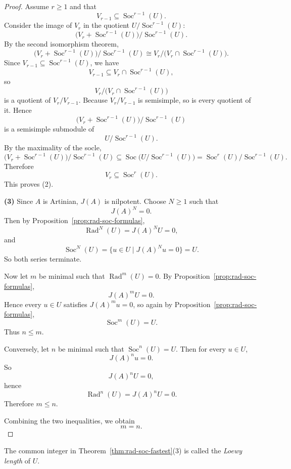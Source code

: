 \begin{proof}
    Assume $r\ge 1$ and that
    \[
        V_{r-1}\subseteq \operatorname{Soc}^{r-1}(U).
    \]
    Consider the image of $V_r$ in the quotient $U/\operatorname{Soc}^{r-1}(U)$:
    \[
        \bigl(V_r+\operatorname{Soc}^{r-1}(U)\bigr)\big/\operatorname{Soc}^{r-1}(U).
    \]
    By the second isomorphism theorem,
    \[
        \bigl(V_r+\operatorname{Soc}^{r-1}(U)\bigr)\big/\operatorname{Soc}^{r-1}(U)
        \cong
        V_r/\bigl(V_r\cap \operatorname{Soc}^{r-1}(U)\bigr).
    \]
    Since $V_{r-1}\subseteq \operatorname{Soc}^{r-1}(U)$, we have
    \[
        V_{r-1}\subseteq V_r\cap \operatorname{Soc}^{r-1}(U),
    \]
    so
    \[
        V_r/\bigl(V_r\cap \operatorname{Soc}^{r-1}(U)\bigr)
    \]
    is a quotient of $V_r/V_{r-1}$. Because $V_r/V_{r-1}$ is semisimple, so is every quotient of it.
    Hence
    \[
        \bigl(V_r+\operatorname{Soc}^{r-1}(U)\bigr)\big/\operatorname{Soc}^{r-1}(U)
    \]
    is a semisimple submodule of
    \[
        U/\operatorname{Soc}^{r-1}(U).
    \]
    By the maximality of the socle,
    \[
        \bigl(V_r+\operatorname{Soc}^{r-1}(U)\bigr)\big/\operatorname{Soc}^{r-1}(U)
        \subseteq
        \operatorname{Soc}\bigl(U/\operatorname{Soc}^{r-1}(U)\bigr)
        =
        \operatorname{Soc}^r(U)/\operatorname{Soc}^{r-1}(U).
    \]
    Therefore
    \[
        V_r\subseteq \operatorname{Soc}^r(U).
    \]
    This proves \textup{(2)}.

    \bigskip

    \textbf{(3)} Since $A$ is Artinian, $J(A)$ is nilpotent. Choose $N\ge 1$ such that
    \[
        J(A)^N=0.
    \]
    Then by Proposition~\ref{prop:rad-soc-formulas},
    \[
        \operatorname{Rad}^N(U)=J(A)^N U=0,
    \]
    and
    \[
        \operatorname{Soc}^N(U)=\{u\in U\mid J(A)^N u=0\}=U.
    \]
    So both series terminate.

    Now let $m$ be minimal such that $\operatorname{Rad}^m(U)=0$. By Proposition~\ref{prop:rad-soc-formulas},
    \[
        J(A)^mU=0.
    \]
    Hence every $u\in U$ satisfies $J(A)^m u=0$, so again by
    Proposition~\ref{prop:rad-soc-formulas},
    \[
        \operatorname{Soc}^m(U)=U.
    \]
    Thus $n\le m$.

    Conversely, let $n$ be minimal such that $\operatorname{Soc}^n(U)=U$. Then for every $u\in U$,
    \[
        J(A)^n u=0.
    \]
    So
    \[
        J(A)^nU=0,
    \]
    hence
    \[
        \operatorname{Rad}^n(U)=J(A)^nU=0.
    \]
    Therefore $m\le n$.

    Combining the two inequalities, we obtain
    \[
        m=n.
    \]
\end{proof}

\begin{definition}
    The common integer in Theorem~\ref{thm:rad-soc-fastest}(3) is called the
    \emph{Loewy length} of $U$.
\end{definition}

